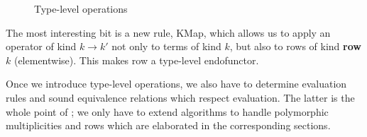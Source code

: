 \documentclass[a4paper,14pt]{extreport}
\begin{document}
\begin{figure}[h!]
    \centering
    \caption{Type-level operations}
    \label{typelevel}
\end{figure}

The most interesting bit is a new rule, KMap, which allows us to apply an
operator of kind $k \to k'$ not only to terms of kind $k$, but also to rows of
kind \textbf{row} $k$ (elementwise). This makes row a type-level endofunctor.

Once we introduce type-level operations, we also have to determine evaluation
rules and sound equivalence relations which respect evaluation. The latter is
the whole point of \cite{stone}; we only have to extend algorithms to handle
polymorphic multiplicities and rows which are elaborated in the corresponding
sections.
\end{document}
